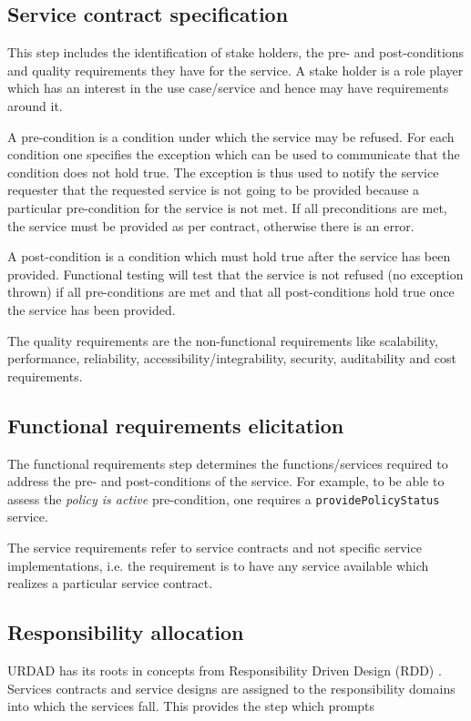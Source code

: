 \subsection{Service contract specification}
This step includes the identification of stake holders, the pre- and post-conditions and quality requirements they have for the service. A stake holder is a role player which has an interest in the use case/service and hence may have requirements around it. 

A pre-condition is a condition under which the service may be refused. For each condition one specifies the exception which can be used to communicate that the condition does not hold true. The exception is thus used to notify the service requester that the requested service is not going to be provided because a particular pre-condition for the service is not met. If all preconditions are met, the service must be provided as per contract, otherwise there is an error. 

A post-condition is a condition which must hold true after the service has been provided. Functional testing will test that the service is not refused (no exception thrown) if all pre-conditions are met and that all post-conditions hold true once the service has been provided.

The quality requirements are the non-functional requirements like scalability, performance, reliability, accessibility/integrability, security, auditability and cost requirements. 

\subsection{Functional requirements elicitation}
The functional requirements step determines the functions/services required to address the pre- and post-conditions of the service. For example, to be able to assess the {\em policy is active} pre-condition, one requires a \verb+providePolicyStatus+ service. 

The service requirements refer to service contracts and not specific service implementations, i.e. the requirement is to have any service available which realizes a particular service contract.

\subsection{Responsibility allocation}

URDAD has its roots in concepts from Responsibility Driven Design (RDD) \cite{wirfs-brock_object-oriented_1989,wirfs-brock_object_2002}. Services contracts and service designs are assigned to the responsibility domains into which the services fall. This provides the step which prompts

